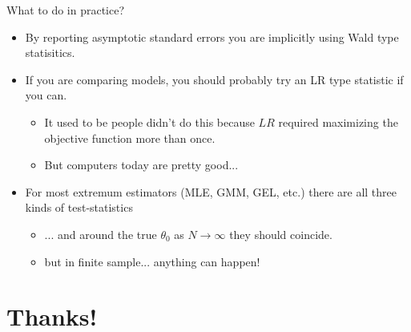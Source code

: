 \documentclass[aspectratio=169]{beamer}
\begin{document}
\begin{frame}{What to do in practice?}
\begin{itemize}
\item By reporting asymptotic standard errors you are implicitly using \alert{Wald} type statisitics.
\item If you are comparing models, you should probably try an \alert{LR} type statistic if you can.
\begin{itemize}
\item It used to be people didn't do this because $LR$ required maximizing the objective function more than once.
\item But computers today are pretty good...
\end{itemize}
\item For most extremum estimators (MLE, GMM, GEL, etc.) there are all three kinds of test-statistics
\begin{itemize}
\item ... and around the true $\theta_0$ as $N\rightarrow \infty$ they should coincide.
\item but in finite sample... anything can happen!
\end{itemize}

\end{itemize}

\end{frame}
\section*{Thanks!}
\end{document}
